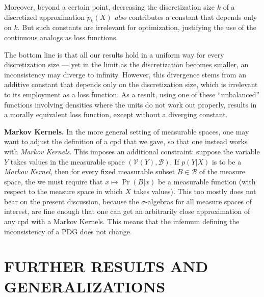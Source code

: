 \documentclass[twoside]{article}
\theoremstyle{plain}
\theoremstyle{definition}
\newcommand{\V}{\mathcal V}
\newcommand{\TODO}[1][INCOMPLETE]{{\centering\Large\color{red}$\langle$~\texttt{#1}~$\rangle$\par}}
\begin{document}
Moreover, beyond a certain point, decreasing the discretization size $k$ of a discretized approximation $\tilde p_k(X)$ \emph{also} contributes a constant that depends only on $k$.
But such constants are irrelevant for optimization, justifying the use of the continuous analogs as loss functions.


The bottom line is that all our results hold in a uniform way for every discretization size --- yet in the limit as the discretization becomes smaller, an inconsistency may diverge to infinity.
However, this divergence stems from an additive constant that depends only on the discretization size, which is irrelevant to its employment as a loss function.
As a result, using one of these ``unbalanced'' functions involving densities where the units do not work out properly, results in a morally equivalent loss function, except without a diverging constant.

\textbf{Markov Kernels.} In the more general setting of measurable spaces, one may want to adjust the definition of a cpd that we gave, so that one instead works with \emph{Markov Kernels}.
This imposes an additional constraint: suppose the variable $Y$ takes values in the measurable space $(\V(Y), \mathcal B)$. If $p(Y|X)$ is to be a \emph{Markov Kernel}, then for every fixed measurable subset $B \in \mathcal B$ of the measure space, the we must require that  $x \mapsto \Pr(B|x)$ be a measurable function (with respect to the measure space in which $X$ takes values).
This too mostly does not bear on the present discussion, because the $\sigma$-algebras for all measure spaces of interest, are fine enough that one can get an arbitrarily close approximation of any cpd with a Markov Kernels.
This means that the infemum defining the inconsistency of a PDG does not change.

\section{FURTHER RESULTS AND GENERALIZATIONS}
\end{document}
